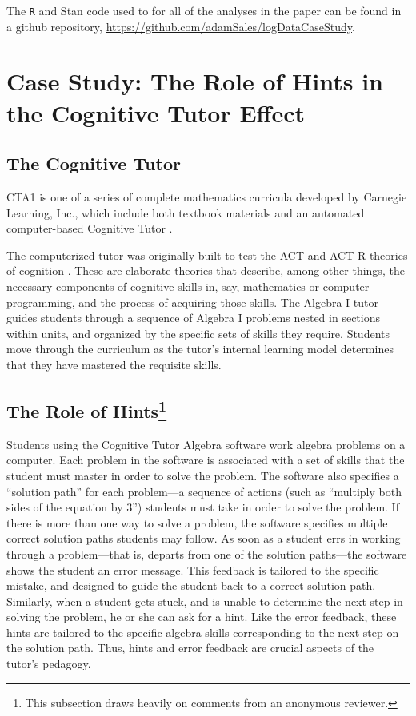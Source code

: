 \documentclass{article}\usepackage[]{graphicx}\usepackage[]{color}
\begin{document}
The \texttt{R} and Stan code used to for all of the analyses in the paper can be found in a github repository, \url{https://github.com/adamSales/logDataCaseStudy}.


\section{Case Study: The Role of Hints in the Cognitive Tutor Effect}

\subsection{The Cognitive Tutor}
CTA1 is one of a series of complete mathematics curricula developed by
Carnegie Learning, Inc., which include both textbook materials and an
automated computer-based Cognitive Tutor
\citep{anderson1995cognitive,pane2014effectiveness}.

The computerized tutor was originally built to test the ACT and ACT-R
theories of cognition \citep{anderson2013architecture}.
These are elaborate theories that describe, among other things, the necessary components of
cognitive skills in, say, mathematics or computer programming, and the
process of acquiring those skills.
The Algebra I tutor guides students through a sequence of Algebra I
problems nested in sections within units, and organized by the specific sets of skills they require.
Students move through the curriculum as the tutor's internal learning
model determines that they have mastered the requisite skills.


\subsection{The Role of Hints\footnote{This subsection draws heavily
  on comments from an anonymous reviewer.}}
Students using the Cognitive Tutor Algebra software work algebra
problems on a computer.
Each problem in the software is associated with a set of skills that
the student must master in order to solve the problem.
The software also specifies a ``solution path'' for each problem---a sequence
of actions (such as ``multiply both sides of the equation by 3'')
students must take in order to solve the problem.
If there is more than one way to solve a problem, the software specifies
multiple correct solution paths students may follow.
As soon as a student errs in working through a problem---that is, departs from one of the
solution paths---the software shows the student an error message.
This feedback is tailored to the specific mistake, and
designed to guide the student back to a correct solution path.
Similarly, when a student gets stuck, and is unable to determine the
next step in solving the problem, he or she can ask for a hint.
Like the error feedback, these hints are tailored to the specific
algebra skills corresponding to the next step on the solution path.
Thus, hints and error feedback are crucial aspects of the tutor's
pedagogy.
\end{document}
